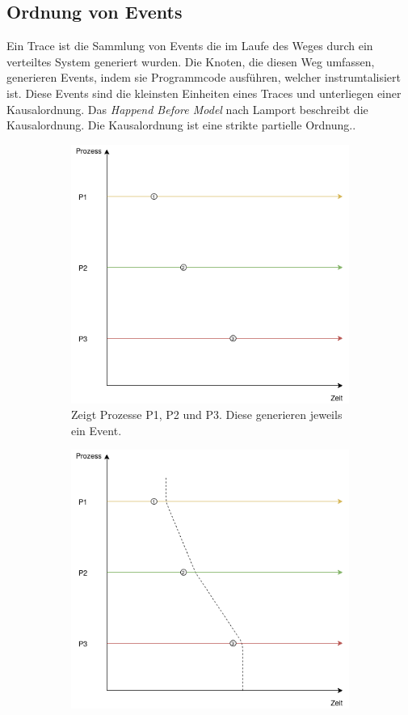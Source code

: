 \subsection{Ordnung von Events}
\label{subsection:Ordnung von Events}
	
Ein Trace ist die Sammlung von Events die im Laufe des Weges durch ein verteiltes System generiert wurden. Die Knoten, die diesen Weg umfassen, generieren Events, indem sie Programmcode ausführen, welcher instrumtalisiert ist. Diese Events sind die kleinsten Einheiten eines Traces und unterliegen einer Kausalordnung. Das \emph{Happend Before Model} nach Lamport beschreibt die Kausalordnung. Die Kausalordnung ist eine strikte partielle Ordnung.. 

\begin{figure}[!ht]
	\centering
	\begin{subfigure}[t]{.49\linewidth}
		\centering\includegraphics[width=.8\linewidth]{img/synchronisation/PartialOrdering_Concurrent.png}
		\caption[Abbildung]{Zeigt Prozesse P1, P2 und P3. Diese generieren jeweils ein Event.}
		\label{fig:Partial_Ordering_Concurrent_explained_1}
	\end{subfigure}
	\begin{subfigure}[t]{.49\linewidth}
		\centering\includegraphics[width=.8\linewidth]{img/synchronisation/PartialOrdering_Concurrent_Explained}

\end{subfigure}
\end{figure}
